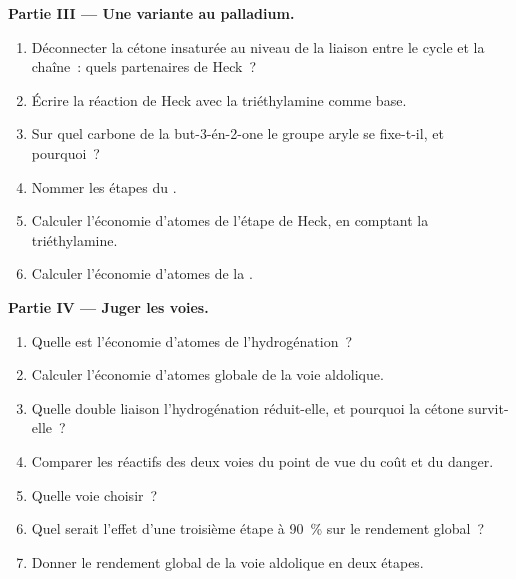 \begin{problem}
\medskip
\noindent\textbf{Partie III --- Une variante au palladium.}
\begin{enumerate}[resume]
  \item Déconnecter la cétone insaturée au niveau de la liaison entre le cycle et la chaîne~: quels
        partenaires de Heck~?
  \item Écrire la réaction de Heck avec la triéthylamine comme base.
  \item Sur quel carbone de la but-3-én-2-one le groupe aryle se fixe-t-il, et pourquoi~?
  \item Nommer les étapes du .
  \item Calculer l'économie d'atomes de l'étape de Heck, en comptant la triéthylamine.
  \item Calculer l'économie d'atomes de la .
\end{enumerate}

\medskip
\noindent\textbf{Partie IV --- Juger les voies.}
\begin{enumerate}[resume]
  \item Quelle est l'économie d'atomes de l'hydrogénation~?
  \item Calculer l'économie d'atomes globale de la voie aldolique.
  \item Quelle double liaison l'hydrogénation réduit-elle, et pourquoi la cétone survit-elle~?
  \item Comparer les réactifs des deux voies du point de vue du coût et du danger.
  \item Quelle voie choisir~?
  \item Quel serait l'effet d'une troisième étape à 90~\% sur le rendement global~?
  \item Donner le rendement global de la voie aldolique en deux étapes.
\end{enumerate}
\end{problem}
